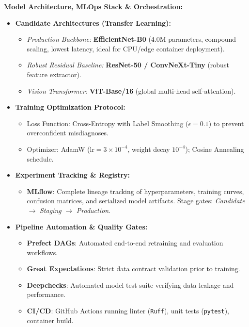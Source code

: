 \documentclass[8pt]{article}
\begin{document}
\begin{minipage}[t]{0.327\linewidth}%
  \begin{tcolorbox}[
    canvasbox,
    colback=bgModel,
    colframe=headModel,
    title={6. BUILDING \& UPDATING MODELS},
    boxed title style={colback=headModel},
    height=68mm
  ]
  \fontsize{7.2pt}{8.8pt}\selectfont
  \textbf{Model Architecture, MLOps Stack \& Orchestration:}
  \vspace{1mm}
  \begin{itemize}
    \item \textbf{Candidate Architectures (Transfer Learning):}
      \begin{itemize}
        \item \emph{Production Backbone:} \textbf{EfficientNet-B0} (4.0M parameters, compound scaling, lowest latency, ideal for CPU/edge container deployment).
        \item \emph{Robust Residual Baseline:} \textbf{ResNet-50 / ConvNeXt-Tiny} (robust feature extractor).
        \item \emph{Vision Transformer:} \textbf{ViT-Base/16} (global multi-head self-attention).
      \end{itemize}
    \item \textbf{Training Optimization Protocol:}
      \begin{itemize}
        \item Loss Function: Cross-Entropy with Label Smoothing ($\epsilon = 0.1$) to prevent overconfident misdiagnoses.
        \item Optimizer: AdamW ($\text{lr} = 3 \times 10^{-4}$, weight decay $10^{-4}$); Cosine Annealing schedule.
      \end{itemize}
    \item \textbf{Experiment Tracking \& Registry:}
      \begin{itemize}
        \item \textbf{MLflow}: Complete lineage tracking of hyperparameters, training curves, confusion matrices, and serialized model artifacts. Stage gates: \emph{Candidate} $\rightarrow$ \emph{Staging} $\rightarrow$ \emph{Production}.
      \end{itemize}
    \item \textbf{Pipeline Automation \& Quality Gates:}
      \begin{itemize}
        \item \textbf{Prefect DAGs}: Automated end-to-end retraining and evaluation workflows.
        \item \textbf{Great Expectations}: Strict data contract validation prior to training.
        \item \textbf{Deepchecks}: Automated model test suite verifying data leakage and performance.
        \item \textbf{CI/CD}: GitHub Actions running linter (\texttt{Ruff}), unit tests (\texttt{pytest}), container build.
      \end{itemize}
  \end{itemize}
  \end{tcolorbox}%
\end{minipage}%
\end{document}
